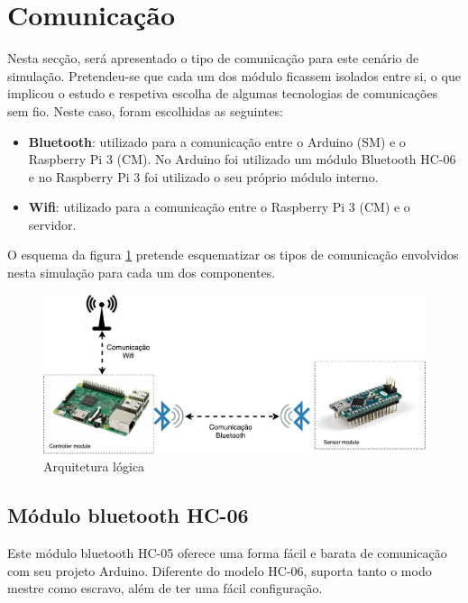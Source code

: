 \newpage
\section{Comunicação}

Nesta secção, será apresentado o tipo de comunicação para este cenário de simulação. Pretendeu-se que cada um dos módulo ficassem isolados entre si, o que implicou o estudo e respetiva escolha de algumas tecnologias de comunicações sem fio. Neste caso, foram escolhidas as seguintes: 

\begin{itemize}
	\item \textbf{Bluetooth}: utilizado para a comunicação entre o Arduino (\ac{SM}) e o Raspberry Pi 3 (\ac{CM}). No Arduino foi utilizado um módulo Bluetooth HC-06 e no Raspberry Pi 3 foi utilizado o seu próprio módulo interno. 
	\item \textbf{Wifi}: utilizado para a comunicação entre o Raspberry Pi 3 (\ac{CM}) e o servidor. 
\end{itemize}


O esquema da figura \ref{esquemcomm} pretende esquematizar os tipos de comunicação envolvidos nesta simulação para cada um dos componentes. 

\begin{figure}[!htb]
	\centering
	\includegraphics[width=\linewidth]{img/comm-blue/HW-geral.pdf}
	\caption{Arquitetura lógica}
	\label{esquemcomm}
\end{figure}




\subsection{Módulo bluetooth HC-06}



Este módulo bluetooth HC-05 oferece uma forma fácil e barata de comunicação com seu projeto Arduino. Diferente do modelo HC-06, suporta tanto o modo mestre como escravo, além de ter uma fácil configuração.

